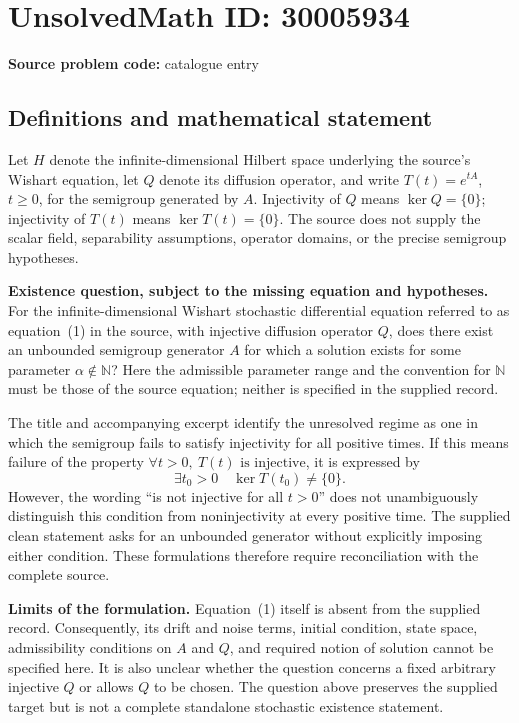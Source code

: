 \documentclass[11pt]{article}
\begin{document}
\section*{UnsolvedMath ID: 30005934}
\textbf{Source problem code:} catalogue entry
\subsection{Definitions and mathematical statement}
Let \(H\) denote the infinite-dimensional Hilbert space underlying the source's Wishart equation, let \(Q\) denote its diffusion operator, and write \(T(t)=e^{tA}\), \(t\geq 0\), for the semigroup generated by \(A\). Injectivity of \(Q\) means \(\ker Q=\{0\}\); injectivity of \(T(t)\) means \(\ker T(t)=\{0\}\). The source does not supply the scalar field, separability assumptions, operator domains, or the precise semigroup hypotheses.

\textbf{Existence question, subject to the missing equation and hypotheses.} For the infinite-dimensional Wishart stochastic differential equation referred to as equation~(1) in the source, with injective diffusion operator \(Q\), does there exist an unbounded semigroup generator \(A\) for which a solution exists for some parameter \(\alpha\notin\mathbb N\)? Here the admissible parameter range and the convention for \(\mathbb N\) must be those of the source equation; neither is specified in the supplied record.

The title and accompanying excerpt identify the unresolved regime as one in which the semigroup fails to satisfy injectivity for all positive times. If this means failure of the property \(\forall t>0,\ T(t)\text{ is injective}\), it is expressed by
\[
\exists t_0>0\quad \ker T(t_0)\ne\{0\}.
\]
However, the wording ``is not injective for all \(t>0\)'' does not unambiguously distinguish this condition from noninjectivity at every positive time. The supplied clean statement asks for an unbounded generator without explicitly imposing either condition. These formulations therefore require reconciliation with the complete source.

\textbf{Limits of the formulation.} Equation~(1) itself is absent from the supplied record. Consequently, its drift and noise terms, initial condition, state space, admissibility conditions on \(A\) and \(Q\), and required notion of solution cannot be specified here. It is also unclear whether the question concerns a fixed arbitrary injective \(Q\) or allows \(Q\) to be chosen. The question above preserves the supplied target but is not a complete standalone stochastic existence statement.
\end{document}
